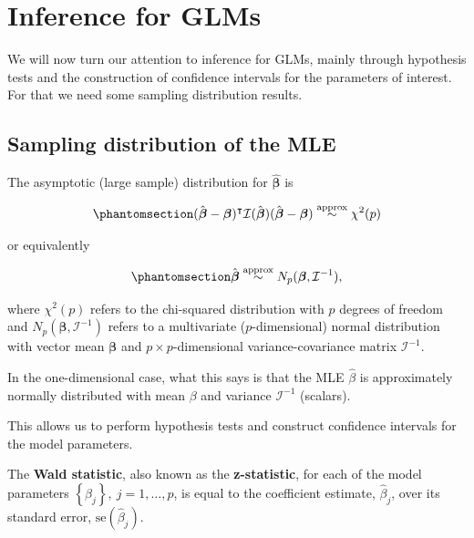 \documentclass[
  a4paper,
  DIV=11,
  numbers=noendperiod]{scrreprt}
\newcommand{\term}[1]{\textbf{#1}}
\newenvironment{fbxSimple}[3]{\begin{tcolorbox}[enhanced, breakable,%
attach boxed title to top*={xshift=1.4pt},
boxed title style={boxrule=0.0mm, fuzzy shadow={1pt}{-1pt}{0mm}{0.1mm}{gray}, arc=.3em, rounded corners=east, sharp corners=west}, colframe=#1-color2, colbacktitle=#1-color1, colback = white, coltitle=black,  titlerule=0mm, toprule=0pt, bottomrule=.7pt, leftrule=.3em, rightrule=.7pt, outer arc=.3em,  	left=.5em, right=.5em, bottomtitle=1mm, toptitle=1mm,title=\textbf{#2}\hspace{0.5em}{#3}]}
{\end{tcolorbox}}
\begin{document}
\section{Inference for GLMs}\label{inference-for-glms}

We will now turn our attention to inference for GLMs, mainly through
hypothesis tests and the construction of confidence intervals for the
parameters of interest. For that we need some sampling distribution
results.

\subsection{Sampling distribution of the
MLE}\label{sampling-distribution-of-the-mle}

The asymptotic (large sample) distribution for
\(\hat{\boldsymbol{\beta}}\) is

\begin{equation}\phantomsection\label{eq-waldchi}{
(\hat{\boldsymbol{\beta}} - \boldsymbol{\beta})^\intercal \mathcal{I}(\hat{\boldsymbol{\beta}}) (\hat{\boldsymbol{\beta}} - \boldsymbol{\beta}) \overset{\text{approx}}{\sim} \chi^2(p)
}\end{equation}

or equivalently

\begin{equation}\phantomsection\label{eq-waldnormal}{
\hat{\boldsymbol{\beta}} \overset{\text{approx}}{\sim} N_p(\boldsymbol{\beta}, \mathcal{I}^{-1}),
}\end{equation}

where \(\chi^2(p)\) refers to the chi-squared distribution with \(p\)
degrees of freedom and \(N_p(\boldsymbol{\beta},\mathcal{I}^{-1})\)
refers to a multivariate (\(p\)-dimensional) normal distribution with
vector mean \(\boldsymbol{\beta}\) and \(p \times p\)-dimensional
variance-covariance matrix \(\mathcal{I}^{-1}\).

In the one-dimensional case, what this says is that the MLE
\(\hat{\beta}\) is approximately normally distributed with mean
\(\beta\) and variance \(\mathcal{I}^{-1}\) (scalars).

This allows us to perform hypothesis tests and construct confidence
intervals for the model parameters.

\label{wald-statistic}
\begin{fbxSimple}{Definition}{Definition 5: }{Wald statistic}
\label{wald-statistic}
The \term{Wald statistic}, also known as the \term{z-statistic}, for
each of the model parameters
\(\left \lbrace \beta_j\right \rbrace,~j=1,\dots,p\), is equal to the
coefficient estimate, \(\hat{\beta}_j\), over its standard error,
\(\text{se}(\hat{\beta}_j)\).

\end{fbxSimple}
\end{document}

